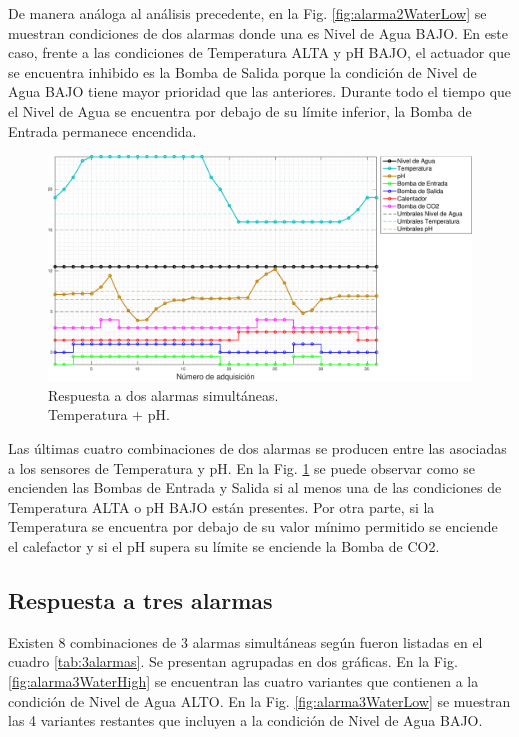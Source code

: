De manera análoga al análisis precedente, en la Fig. \ref{fig:alarma2WaterLow} se muestran condiciones de dos alarmas donde una es Nivel de Agua BAJO.  En este caso, frente a las condiciones de Temperatura ALTA y pH BAJO, el actuador que se encuentra inhibido es la Bomba de Salida porque la condición de Nivel de Agua BAJO tiene mayor prioridad que las anteriores.  Durante todo el tiempo que el Nivel de Agua se encuentra por debajo de su límite inferior, la Bomba de Entrada permanece encendida.

\begin{figure}
\centering
    \includegraphics[width=\textwidth]{./Figures/plot2Temp.pdf}
	\caption{Respuesta a dos alarmas simultáneas.\\ Temperatura + pH.}
	\label{fig:alarma2Temp}
\end{figure}

Las últimas cuatro combinaciones de dos alarmas se producen entre las asociadas a los sensores de Temperatura y pH.  En la Fig. \ref{fig:alarma2Temp} se puede observar como se encienden las Bombas de Entrada y Salida si al menos una de las condiciones de Temperatura ALTA o pH BAJO están presentes.  Por otra parte, si la Temperatura se encuentra por debajo de su valor mínimo permitido se enciende el calefactor y si el pH supera su límite se enciende la Bomba de CO2.


\subsection{Respuesta a tres alarmas}
\label{sec:3alarma}

Existen 8 combinaciones de 3 alarmas simultáneas según fueron listadas en el cuadro \ref{tab:3alarmas}. Se presentan agrupadas en dos gráficas.  En la Fig. \ref{fig:alarma3WaterHigh} se encuentran las cuatro variantes que contienen a la condición de Nivel de Agua ALTO. En la Fig. \ref{fig:alarma3WaterLow} se muestran las 4 variantes restantes que incluyen a la condición de Nivel de Agua BAJO. 

